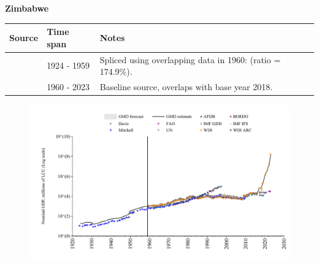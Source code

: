 \documentclass[12pt,a4paper,landscape]{article}
\begin{document}
\begin{adjustbox}{max totalsize={\paperwidth}{\paperheight},center}
\begin{minipage}[t][\textheight][t]{\textwidth}
\vspace*{0.5cm}
{}
\begin{center}
{\Large\bfseries Zimbabwe}
\end{center}
\vspace{0.5cm}
\begin{table}[H]
\centering
\small
\begin{tabular}{|l|l|l|}
\hline
\textbf{Source} & \textbf{Time span} & \textbf{Notes} \\
\hline
\rowcolor{white}\cite{Mitchell}& 1924 - 1959 &Spliced using overlapping data in 1960: (ratio = 174.9\%).\\
\rowcolor{lightgray}\cite{WDI}& 1960 - 2023 &Baseline source, overlaps with base year 2018.\\
\hline
\end{tabular}
\end{table}
\begin{figure}[H]
\centering
\includegraphics[width=\textwidth,height=0.6\textheight,keepaspectratio]{graphs/ZWE_nGDP.pdf}
\end{figure}
\end{minipage}
\end{adjustbox}
\end{document}
